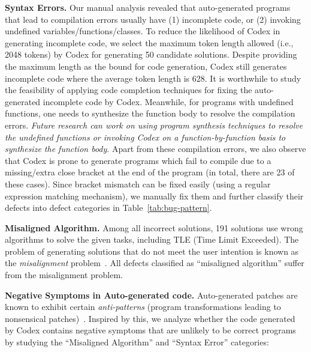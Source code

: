  \textbf{Syntax Errors.} Our manual analysis revealed that auto-generated programs that lead to compilation errors usually have (1) incomplete code, or (2) invoking undefined variables/functions/classes. To reduce the likelihood of Codex in generating incomplete code, we select the maximum token length allowed (i.e., 2048 tokens) by Codex for generating 50 candidate solutions. Despite providing the maximum length as the bound for code generation, Codex still generates incomplete code where the average token length is 628.  It is worthwhile to study the feasibility of applying code completion techniques for fixing the auto-generated incomplete code by Codex. Meanwhile, for programs with undefined functions, one needs to synthesize the function body to resolve the compilation errors. \emph{Future research can work on using program synthesis techniques to resolve the undefined functions or invoking Codex on a function-by-function basis to synthesize the function body}. Apart from these compilation errors, we also observe that Codex is prone to generate programs which fail to compile due to a missing/extra close bracket at the end of the program (in total, there are 23 of these cases). Since bracket mismatch can be fixed easily (using a regular expression matching mechanism), we manually fix them and further classify their defects into defect categories in Table~\ref{tab:bug-pattern}. 

 \textbf{Misaligned Algorithm.} Among all incorrect solutions, 191 solutions use wrong algorithms to solve the given tasks, including TLE (Time Limit Exceeded). The problem of generating solutions that do not meet the user intention is known as the \emph{misalignment} problem~\cite{codex}. All defects classified as ``misaligned algorithm'' suffer from the misalignment problem. 

 \textbf{Negative Symptoms in Auto-generated code.} Auto-generated patches are known to exhibit certain \emph{anti-patterns} (program transformations  leading to nonsensical patches)~\cite{tan2016anti}. Inspired by this, we analyze whether the code generated by Codex contains negative symptoms that are unlikely to be correct programs by studying the ``Misaligned Algorithm'' and ``Syntax Error'' categories:

